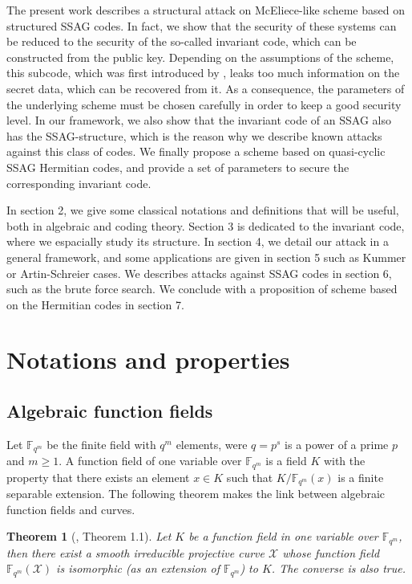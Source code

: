 \documentclass[10pt]{article}
\newtheorem{thm}{Theorem}
\theoremstyle{definition}
\theoremstyle{definition}
\theoremstyle{definition}
\newcommand{\fqm}{\mathbb{F}_{q^m}}
\newcommand{\X}{\mathcal{X}}
\begin{document}
\noindent The present work describes a structural attack on McEliece-like scheme based on structured SSAG codes. In fact, we show that the security of these systems can be reduced to the security of the so-called invariant code, which can be constructed from the public key. Depending on the assumptions of the scheme, this subcode, which was first introduced by \cite{LOI}, leaks too much information on the secret data, which can be recovered from it. As a consequence, the parameters of the underlying scheme must be chosen carefully in order to keep a good security level. In our framework, we also show  that the invariant code of an SSAG also has the SSAG-structure, which is the reason why we describe known attacks against this class of codes. We finally propose a scheme based on quasi-cyclic SSAG Hermitian codes, and provide a set of parameters to secure the corresponding invariant code. 

\vspace*{0.2cm}

\noindent In section 2, we give some classical notations and definitions that will be useful, both in algebraic and coding theory. Section 3 is dedicated to the invariant code, where we espacially study its structure. In section 4, we detail our attack in a general framework, and some applications are given in section 5 such as Kummer or Artin-Schreier cases. We describes attacks against SSAG codes in section 6, such as the brute force search. We conclude with a proposition of scheme based on the Hermitian codes in section 7.


\section{Notations and properties}


\subsection{Algebraic function fields}


Let $\fqm$ be the finite field with $q^m$ elements, were $q=p^s$ is a power of a prime $p$ and $m \geq 1$. A function field of one variable over $\fqm$ is a field $K$ with the property that there exists an element $x\in K$ such that $K/\fqm(x)$ is a finite separable extension. The following theorem makes the link between algebraic function fields and curves.

\begin{thm} [\cite{MOR}, Theorem 1.1]\label{lien curve-function field}
Let $K$ be a function field in one variable over $\fqm$, then there exist a smooth irreducible projective curve $\X$ whose function field $\fqm(\X)$ is isomorphic (as an extension of $\fqm$) to $K$. The converse is also true.
\end{thm}
\end{document}
